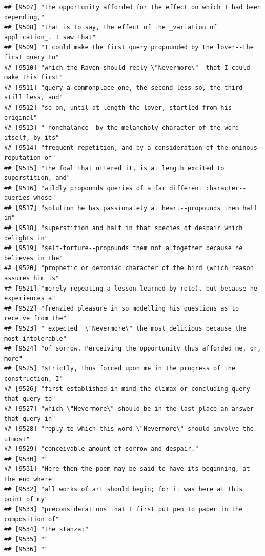 \documentclass{article}\usepackage[]{graphicx}\usepackage[]{color}
\makeatletter
\newenvironment{kframe}{%
 \def\at@end@of@kframe{}%
 \ifinner\ifhmode%
  \def\at@end@of@kframe{\end{minipage}}%
  \begin{minipage}{\columnwidth}%
 \fi\fi%
 \def\FrameCommand##1{\hskip\@totalleftmargin \hskip-\fboxsep
 \colorbox{shadecolor}{##1}\hskip-\fboxsep
     \hskip-\linewidth \hskip-\@totalleftmargin \hskip\columnwidth}%
 \MakeFramed {\advance\hsize-\width
   \@totalleftmargin\z@ \linewidth\hsize
   \@setminipage}}%
 {\par\unskip\endMakeFramed%
 \at@end@of@kframe}
\newenvironment{knitrout}{}{} %
\makeatother
\begin{document}
\begin{knitrout}
\begin{kframe}
\begin{verbatim}
## [9507] "the opportunity afforded for the effect on which I had been depending,"      
## [9508] "that is to say, the effect of the _variation of application_. I saw that"    
## [9509] "I could make the first query propounded by the lover--the first query to"    
## [9510] "which the Raven should reply \"Nevermore\"--that I could make this first"    
## [9511] "query a commonplace one, the second less so, the third still less, and"      
## [9512] "so on, until at length the lover, startled from his original"                
## [9513] "_nonchalance_ by the melancholy character of the word itself, by its"        
## [9514] "frequent repetition, and by a consideration of the ominous reputation of"    
## [9515] "the fowl that uttered it, is at length excited to superstition, and"         
## [9516] "wildly propounds queries of a far different character--queries whose"        
## [9517] "solution he has passionately at heart--propounds them half in"               
## [9518] "superstition and half in that species of despair which delights in"          
## [9519] "self-torture--propounds them not altogether because he believes in the"      
## [9520] "prophetic or demoniac character of the bird (which reason assures him is"    
## [9521] "merely repeating a lesson learned by rote), but because he experiences a"    
## [9522] "frenzied pleasure in so modelling his questions as to receive from the"      
## [9523] "_expected_ \"Nevermore\" the most delicious because the most intolerable"    
## [9524] "of sorrow. Perceiving the opportunity thus afforded me, or, more"            
## [9525] "strictly, thus forced upon me in the progress of the construction, I"        
## [9526] "first established in mind the climax or concluding query--that query to"     
## [9527] "which \"Nevermore\" should be in the last place an answer--that query in"    
## [9528] "reply to which this word \"Nevermore\" should involve the utmost"            
## [9529] "conceivable amount of sorrow and despair."                                   
## [9530] ""                                                                            
## [9531] "Here then the poem may be said to have its beginning, at the end where"      
## [9532] "all works of art should begin; for it was here at this point of my"          
## [9533] "preconsiderations that I first put pen to paper in the composition of"       
## [9534] "the stanza:"                                                                 
## [9535] ""                                                                            
## [9536] ""                                                                            

\end{verbatim}
\end{kframe}
\end{knitrout}
\end{document}
